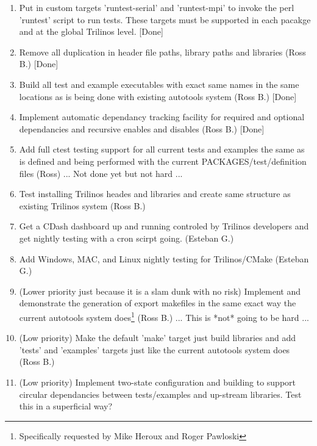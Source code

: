 \documentclass[pdf,ps2pdf,11pt]{SANDreport}
\begin{document}
\begin{enumerate}
  \begin{enumerate}

  {}\item Put in custom targets 'runtest-serial' and 'runtest-mpi' to
  invoke the perl 'runtest' script to run tests.  These targets must
  be supported in each pacakge and at the global Trilinos
  level. [Done]

  {}\item Remove all duplication in header file paths, library paths
  and libraries (Ross B.) [Done]

  {}\item Build all test and example executables with exact same names
  in the same locations as is being done with existing autotools
  system (Ross B.) [Done]

  {}\item Implement automatic dependancy tracking facility for
  required and optional dependancies and recursive enables and
  disables (Ross B.) [Done]

  {}\item Add full ctest testing support for all current tests and
  examples the same as is defined and being performed with the current
  PACKAGES/test/definition files (Ross) ... Not done yet but not hard
  ...

  {}\item Test installing Trilinos heades and libraries and create
  same structure as existing Trilinos system (Ross B.)

  {}\item Get a CDash dashboard up and running controled by Trilinos
  developers and get nightly testing with a cron scirpt
  going. (Esteban G.)

  {}\item Add Windows, MAC, and Linux nightly testing for
  Trilinos/CMake (Esteban G.)

  {}\item (Lower priority just because it is a slam dunk with no risk)
  Implement and demonstrate the generation of export makefiles in the
  same exact way the current autotools system
  does\footnote{Specifically requested by Mike Heroux and Roger
  Pawloski} (Ross B.) ... This is *not* going to be hard ...

  {}\item (Low priority) Make the default 'make' target just build
  libraries and add 'tests' and 'examples' targets just like the
  current autotools system does (Ross B.)

  {}\item (Low priority) Implement two-state configuration and
  building to support circular dependancies between tests/examples and
  up-stream libraries.  Test this in a superficial way?


\end{enumerate}
\end{enumerate}
\end{document}
